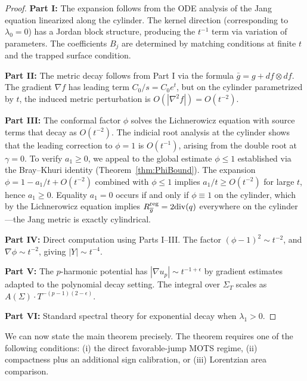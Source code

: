 \begin{proof}
\textbf{Part I:} The expansion follows from the ODE analysis of the Jang equation linearized along the cylinder. The kernel direction (corresponding to $\lambda_0 = 0$) has a Jordan block structure, producing the $t^{-1}$ term via variation of parameters. The coefficients $B_j$ are determined by matching conditions at finite $t$ and the trapped surface condition.

\textbf{Part II:} The metric decay follows from Part I via the formula $\bar{g} = g + df \otimes df$. The gradient $\nabla f$ has leading term $C_0/s = C_0 e^t$, but on the cylinder parametrized by $t$, the induced metric perturbation is $O(|\nabla^2 f|) = O(t^{-2})$.

\textbf{Part III:} The conformal factor $\phi$ solves the Lichnerowicz equation with source terms that decay as $O(t^{-2})$. The indicial root analysis at the cylinder shows that the leading correction to $\phi = 1$ is $O(t^{-1})$, arising from the double root at $\gamma = 0$. To verify $a_1 \ge 0$, we appeal to the global estimate $\phi \le 1$ established via the Bray--Khuri identity (Theorem~\ref{thm:PhiBound}). The expansion $\phi = 1 - a_1/t + O(t^{-2})$ combined with $\phi \le 1$ implies $a_1/t \ge O(t^{-2})$ for large $t$, hence $a_1 \ge 0$. Equality $a_1 = 0$ occurs if and only if $\phi \equiv 1$ on the cylinder, which by the Lichnerowicz equation implies $R^{\mathrm{reg}}_{\overline{g}} = 2\mathrm{div}(q)$ everywhere on the cylinder---the Jang metric is exactly cylindrical.

\textbf{Part IV:} Direct computation using Parts I--III. The factor $(\phi - 1)^2 \sim t^{-2}$, and $\nabla\phi \sim t^{-2}$, giving $|Y| \sim t^{-4}$.

\textbf{Part V:} The $p$-harmonic potential has $|\nabla u_p| \sim t^{-1+\epsilon}$ by gradient estimates adapted to the polynomial decay setting. The integral over $\Sigma_T$ scales as $A(\Sigma) \cdot T^{-(p-1)(2-\epsilon)}$.

\textbf{Part VI:} Standard spectral theory for exponential decay when $\lambda_1 > 0$.
\end{proof}

We can now state the main theorem precisely. The theorem requires one of the following conditions: (i) the direct favorable-jump MOTS regime, (ii) compactness plus an additional sign calibration, or (iii) Lorentzian area comparison.

